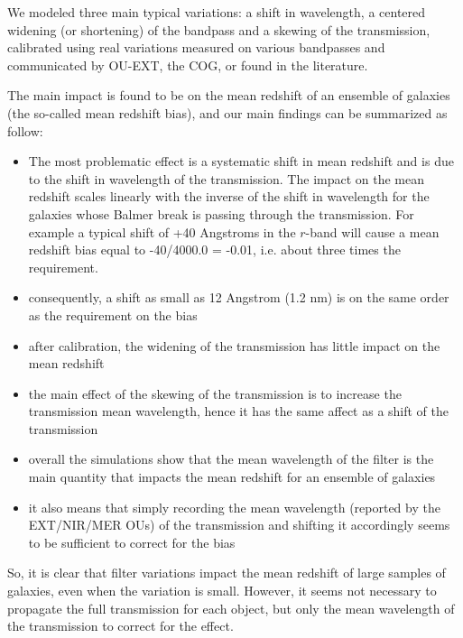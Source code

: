 \documentclass[11pt]{article}
\begin{document}
We modeled three main typical variations: a shift in wavelength, a
centered widening (or shortening) of the bandpass and a skewing of the
transmission, calibrated using real variations measured on various
bandpasses and communicated by OU-EXT, the COG, or found in the
literature.

The main impact is found to be on the mean redshift of an ensemble of
galaxies (the so-called mean redshift bias), and our main findings can
be summarized as follow:

\begin{itemize}
\item
  The most problematic effect is a systematic shift in mean redshift and
  is due to the shift in wavelength of the transmission. The impact on
  the mean redshift scales linearly with the inverse of the shift in
  wavelength for the galaxies whose Balmer break is passing through the
  transmission. For example a typical shift of +40 Angstroms in the
  \(r\)-band will cause a mean redshift bias equal to -40/4000.0 =
  -0.01, i.e. about three times the requirement.
\item
  consequently, a shift as small as 12 Angstrom (1.2 nm) is on the same
  order as the requirement on the bias
\item
  after calibration, the widening of the transmission has little impact
  on the mean redshift
\item
  the main effect of the skewing of the transmission is to increase the
  transmission mean wavelength, hence it has the same affect as a shift
  of the transmission
\item
  overall the simulations show that the mean wavelength of the filter is
  the main quantity that impacts the mean redshift for an ensemble of
  galaxies
\item
  it also means that simply recording the mean wavelength (reported by
  the EXT/NIR/MER OUs) of the transmission and shifting it accordingly
  seems to be sufficient to correct for the bias
\end{itemize}

So, it is clear that filter variations impact the mean redshift of large
samples of galaxies, even when the variation is small. However, it seems
not necessary to propagate the full transmission for each object, but
only the mean wavelength of the transmission to correct for the effect.


    
    
    
    
\end{document}
